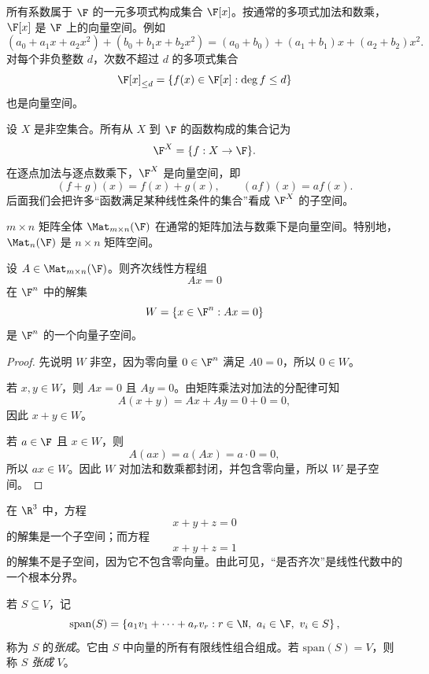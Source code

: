 \begin{example}[多项式空间]
所有系数属于 $\F$ 的一元多项式构成集合 $\F[x]$。按通常的多项式加法和数乘，$\F[x]$ 是 $\F$ 上的向量空间。例如
\[
(a_0+a_1x+a_2x^2)+(b_0+b_1x+b_2x^2)=(a_0+b_0)+(a_1+b_1)x+(a_2+b_2)x^2.
\]
对每个非负整数 $d$，次数不超过 $d$ 的多项式集合
\[
\F[x]_{\le d}=\{f(x)\in\F[x]:\deg f\le d\}
\]
也是向量空间。
\end{example}

\begin{example}[函数空间]
设 $X$ 是非空集合。所有从 $X$ 到 $\F$ 的函数构成的集合记为
\[
\F^X=\{f:X\to\F\}.
\]
在逐点加法与逐点数乘下，$\F^X$ 是向量空间，即
\[
(f+g)(x)=f(x)+g(x),\qquad (af)(x)=a f(x).
\]
后面我们会把许多“函数满足某种线性条件的集合”看成 $\F^X$ 的子空间。
\end{example}

\begin{example}[矩阵空间]
$m\times n$ 矩阵全体 $\Mat_{m\times n}(\F)$ 在通常的矩阵加法与数乘下是向量空间。特别地，$\Mat_n(\F)$ 是 $n\times n$ 矩阵空间。
\end{example}

\begin{proposition}[齐次线性方程组的解空间]
设 $A\in\Mat_{m\times n}(\F)$。则齐次线性方程组
\[
Ax=0
\]
在 $\F^n$ 中的解集
\[
W=\{x\in\F^n:Ax=0\}
\]
是 $\F^n$ 的一个向量子空间。
\end{proposition}

\begin{proof}
先说明 $W$ 非空，因为零向量 $0\in\F^n$ 满足 $A0=0$，所以 $0\in W$。

若 $x,y\in W$，则 $Ax=0$ 且 $Ay=0$。由矩阵乘法对加法的分配律可知
\[
A(x+y)=Ax+Ay=0+0=0,
\]
因此 $x+y\in W$。

若 $a\in\F$ 且 $x\in W$，则
\[
A(ax)=a(Ax)=a\cdot 0=0,
\]
所以 $ax\in W$。因此 $W$ 对加法和数乘都封闭，并包含零向量，所以 $W$ 是子空间。
\end{proof}

\begin{example}[齐次系统与非齐次系统]
在 $\R^3$ 中，方程
\[
x+y+z=0
\]
的解集是一个子空间；而方程
\[
x+y+z=1
\]
的解集不是子空间，因为它不包含零向量。由此可见，“是否齐次”是线性代数中的一个根本分界。
\end{example}

\begin{notation}
若 $S\subseteq V$，记
\[
\mathrm{span}(S)=\left\{a_1v_1+\cdots+a_rv_r: r\in\N,\ a_i\in\F,\ v_i\in S\right\},
\]
称为 $S$ 的\emph{张成}。它由 $S$ 中向量的所有有限线性组合组成。若 $\mathrm{span}(S)=V$，则称 $S$ \emph{张成} $V$。
\end{notation}

